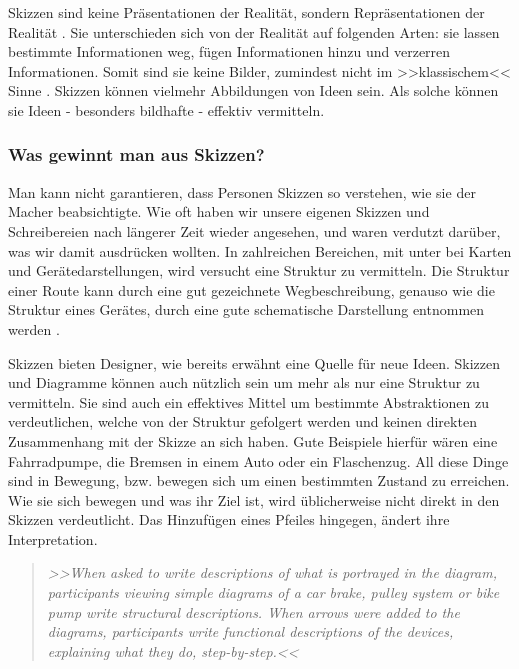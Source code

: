 \medskip Skizzen sind keine Präsentationen der Realität, sondern Repräsentationen der Realität \citep{Tversky:1999}. Sie unterschieden sich von der Realität auf folgenden Arten: sie lassen bestimmte Informationen weg, fügen Informationen hinzu und verzerren Informationen. Somit sind sie keine Bilder, zumindest nicht im >>klassischem<< Sinne \citep{Kosslyn:1980}. Skizzen können vielmehr Abbildungen von Ideen sein. Als solche können sie Ideen - besonders bildhafte - effektiv vermitteln.

\subsubsection{Was gewinnt man aus Skizzen?} Man kann nicht garantieren, dass Personen Skizzen so verstehen, wie sie der Macher beabsichtigte. Wie oft haben wir unsere eigenen Skizzen und Schreibereien nach längerer Zeit wieder angesehen, und waren verdutzt darüber, was wir damit ausdrücken wollten. In zahlreichen Bereichen, mit unter bei Karten und Gerätedarstellungen, wird versucht eine Struktur zu vermitteln. Die Struktur einer Route kann durch eine gut gezeichnete Wegbeschreibung, genauso wie die Struktur eines Gerätes, durch eine gute schematische Darstellung entnommen werden \citep{Heiser:2002}.

\medskip Skizzen bieten Designer, wie bereits erwähnt eine Quelle für neue Ideen. Skizzen und Diagramme können auch nützlich sein um mehr als nur eine Struktur zu vermitteln. Sie sind auch ein effektives Mittel um bestimmte Abstraktionen zu verdeutlichen, welche von der Struktur gefolgert werden und keinen direkten Zusammenhang mit der Skizze an sich haben. Gute Beispiele hierfür wären eine Fahrradpumpe, die Bremsen in einem Auto oder ein Flaschenzug. All diese Dinge sind in Bewegung, bzw. bewegen sich um einen bestimmten Zustand zu erreichen. Wie sie sich bewegen und was ihr Ziel ist, wird üblicherweise nicht direkt in den Skizzen verdeutlicht. Das Hinzufügen eines Pfeiles hingegen, ändert ihre Interpretation.

\begin{quote}
	\textsl{>>When asked to write descriptions of what is portrayed in the diagram, participants viewing simple diagrams of a car brake, pulley system or bike pump write structural descriptions. When arrows were added to the diagrams, participants write functional descriptions of the devices, explaining what they do, step-by-step.<<}
\begin{flushright}\citep{Tversky:2002}\end{flushright}
\end{quote}

